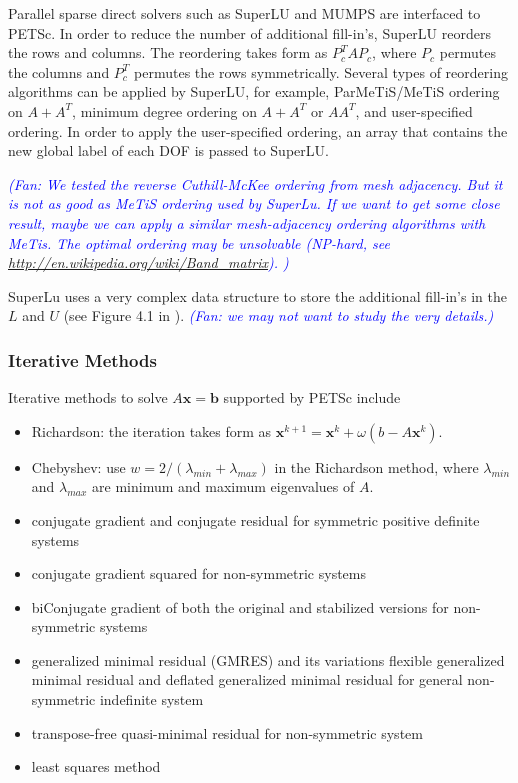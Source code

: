 \documentclass[11pt]{article}  %
\begin{document}
Parallel sparse direct solvers such as  SuperLU \cite{superlu_ug99} and MUMPS \cite{amestoy2000multifrontal}  are interfaced to PETSc.  In order to reduce the number of additional fill-in's, SuperLU reorders the rows and columns. The reordering takes form as  $P_c^{T} A P_c$, where $P_c$ permutes the columns and   $P_c^{T}$ permutes the rows symmetrically.  Several types of reordering algorithms can be applied by SuperLU, for example, ParMeTiS/MeTiS ordering on $A+A^{T}$,  minimum degree ordering on  $A+A^{T}$ or $AA^T$, and user-specified ordering.  In order to apply the user-specified ordering,  an array that contains the new global  label of each DOF is passed to SuperLU. 

\textit{\textcolor{blue}{(Fan: We tested the reverse Cuthill-McKee ordering from mesh adjacency. But it is not as good as MeTiS ordering used by SuperLu. If we want to get some close result, maybe we can apply a similar mesh-adjacency ordering algorithms with MeTis. The optimal ordering may be unsolvable (NP-hard, see \url{http://en.wikipedia.org/wiki/Band_matrix}). )}}

SuperLu uses a very complex data structure to store the additional fill-in's in the $L$ and $U$ (see Figure 4.1 in \cite{superlu_ug99}). \textit{\textcolor{blue}{(Fan: we may not want to study the very details.)}}

\subsubsection{Iterative Methods}
Iterative methods \cite{barrett1994templates} to solve $A\mathbf{x}=\mathbf{b}$ supported by PETSc include  \cite{petsc-ug}
\begin{itemize}
\item Richardson: the iteration takes form as $\mathbf{x}^{k+1}=\mathbf{x}^k + \omega (b- A\mathbf{x}^k)$.
\item Chebyshev: use $w=2/(\lambda_{min}+\lambda_{max})$ in the Richardson method, where $\lambda_{min}$ and $\lambda_{max}$ are minimum and maximum eigenvalues of $A$.
\item conjugate gradient and  conjugate residual  for symmetric positive definite systems
\item conjugate gradient squared for non-symmetric systems
\item biConjugate gradient of both the original and stabilized versions for non-symmetric systems
\item generalized minimal residual (GMRES) and its variations flexible generalized minimal residual and deﬂated generalized minimal residual  for general  non-symmetric indefinite system
\item transpose-free quasi-minimal residual for non-symmetric system
\item least squares method 
\end{itemize}
\end{document}

